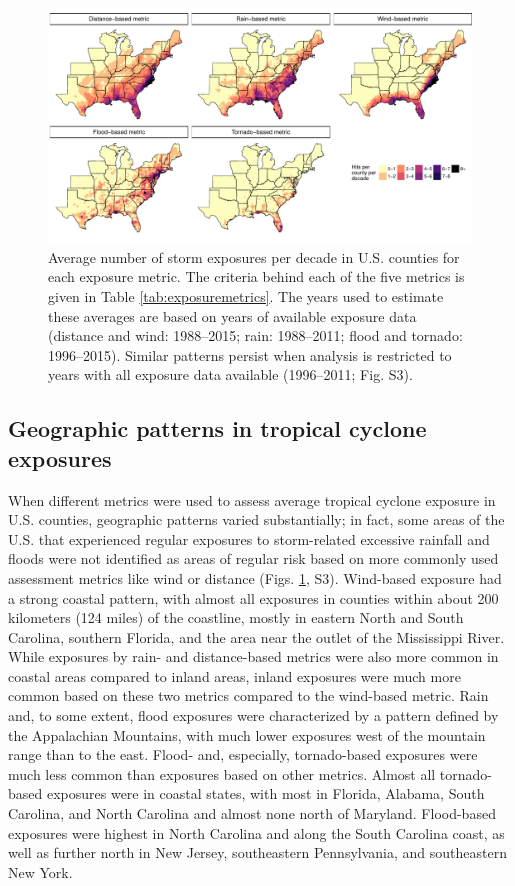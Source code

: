 \documentclass[fleqn,10pt,lineno]{olplainarticle}
\begin{document}
\begin{figure}%
\centering
\includegraphics[width=16cm]{averageexposureonly} 
\caption{Average number of storm exposures per decade in U.S. counties for 
each exposure metric. The criteria behind each of the five metrics is given 
in Table \ref{tab:exposuremetrics}. The years used to estimate these averages 
are based on years of available exposure data (distance and wind: 1988--2015; 
rain: 1988--2011; flood and tornado: 1996--2015). Similar patterns persist when
analysis is restricted to years with all exposure data available (1996--2011;
Fig. S3).} 
\label{fig:averageexposure} 
\end{figure}

\subsection*{Geographic patterns in tropical cyclone exposures}

When different metrics were used to assess average tropical cyclone exposure in
U.S. counties, geographic patterns varied substantially; in fact, some areas of
the U.S. that experienced regular exposures to storm-related excessive rainfall
and floods were not identified as areas of regular risk based on more commonly
used assessment metrics like wind or distance (Figs. \ref{fig:averageexposure},
S3). Wind-based exposure had a strong coastal pattern, with almost all
exposures in counties within about 200 kilometers (124 miles) of the coastline,
mostly in eastern North and South Carolina, southern Florida, and the area near
the outlet of the Mississippi River. While exposures by rain- and
distance-based metrics were also more common in coastal areas compared to
inland areas, inland exposures were much more common based on these two metrics
compared to the wind-based metric. Rain and, to some extent, flood exposures
were characterized by a pattern defined by the Appalachian Mountains, with much
lower exposures west of the mountain range than to the east.  Flood- and,
especially, tornado-based exposures were much less common than exposures based
on other metrics. Almost all tornado-based exposures were in coastal states,
with most in Florida, Alabama, South Carolina, and North Carolina and almost
none north of Maryland. Flood-based exposures were highest in North Carolina
and along the South Carolina coast, as well as further north in New Jersey,
southeastern Pennsylvania, and southeastern New York.
\end{document}
